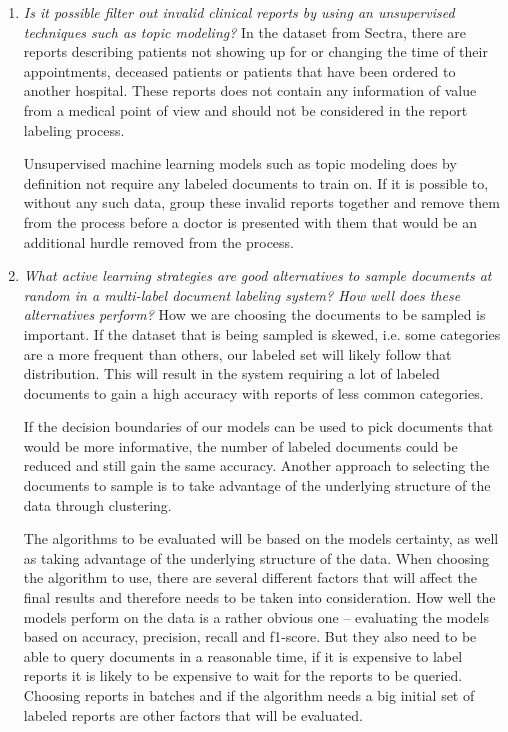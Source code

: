 \begin{enumerate}

\item \textit{Is it possible filter out invalid clinical reports by using an unsupervised techniques such as topic modeling?}
      \newline
      In the dataset from Sectra, there are reports describing patients not showing up for or changing the time of their appointments, deceased patients or patients that have been ordered to another hospital.
      These reports does not contain any information of value from a medical point of view and should not be considered in the report labeling process.

      Unsupervised machine learning models such as topic modeling does by definition not require any labeled documents to train on.
      If it is possible to, without any such data, group these invalid reports together and remove them from the process before a doctor is presented with them that would be an additional hurdle removed from the process.

\item \label{intro:re-q2} 
      \textit{What active learning strategies are good alternatives to sample documents at random in a multi-label document labeling system? How well does these alternatives perform?}
      \newline
      How we are choosing the documents to be sampled is important.
      If the dataset that is being sampled is skewed, i.e. some categories are a more frequent than others, our labeled set will likely follow that distribution.
      This will result in the system requiring a lot of labeled documents to gain a high accuracy with reports of less common categories.

      If the decision boundaries of our models can be used to pick documents that would be more informative, the number of labeled documents could be reduced and still gain the same accuracy.
      Another approach to selecting the documents to sample is to take advantage of the underlying structure of the data through clustering.

      The algorithms to be evaluated will be based on the models certainty, as well as taking advantage of the underlying structure of the data.
      When choosing the algorithm to use, there are several different factors that will affect the final results and therefore needs to be taken into consideration.
      How well the models perform on the data is a rather obvious one -- evaluating the models based on accuracy, precision, recall and f1-score.
      But they also need to be able to query documents in a reasonable time, if it is expensive to label reports it is likely to be expensive to wait for the reports to be queried.
      Choosing reports in batches and if the algorithm needs a big initial set of labeled reports are other factors that will be evaluated.


\end{enumerate}
